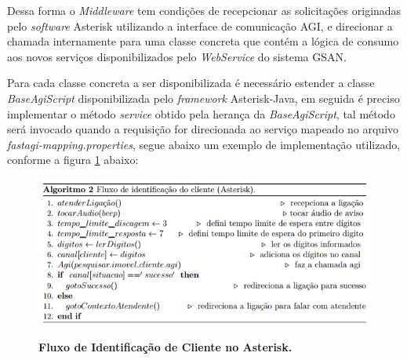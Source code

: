 Dessa forma o \textit{Middleware} tem condições de recepcionar as solicitações originadas pelo \textit{software} Asterisk utilizando a interface de comunicação AGI, e direcionar a chamada internamente para uma classe concreta que contém a lógica de consumo aos novos serviços disponibilizados pelo \textit{WebService} do sistema GSAN.

Para cada classe concreta a ser disponibilizada é necessário estender a classe \textit{BaseAgiScript} disponibilizada pelo \textit{framework} Asterisk-Java, em seguida é preciso implementar o método \textit{service} obtido pela herança da \textit{BaseAgiScript}, tal método será invocado quando a requisição for direcionada ao serviço mapeado no arquivo \textit{fastagi-mapping.properties}, segue abaixo um exemplo de implementação utilizado, conforme a figura \ref{figura:fluxoIdentificacaoClienteAsterisk} abaixo:



\begin{figure}[H]
	\caption{\textbf{Fluxo de Identificação de Cliente no Asterisk.}}	
	\label{figura:fluxoIdentificacaoClienteAsterisk}
	\includegraphics{figuras/algoritmo_2.png}
	\\[6pt]
	\fontsize{10}{12}\selectfont {Fonte: Autoria Própria.}

\end{figure}

